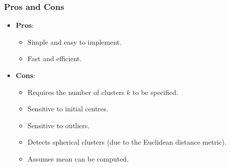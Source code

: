 \documentclass{article}
\begin{document}
\subsubsection{Pros and Cons}
\begin{itemize}
    \item \textbf{Pros}:
          \begin{itemize}
              \item Simple and easy to implement.
              \item Fast and efficient.
          \end{itemize}
    \item \textbf{Cons}:
          \begin{itemize}
              \item Requires the number of clusters \(k\) to be
                    specified.
              \item Sensitive to initial centres.
              \item Sensitive to outliers.
              \item Detects spherical clusters (due to the Euclidean
                    distance metric).
              \item Assumes mean can be computed.
          \end{itemize}
\end{itemize}
\end{document}
